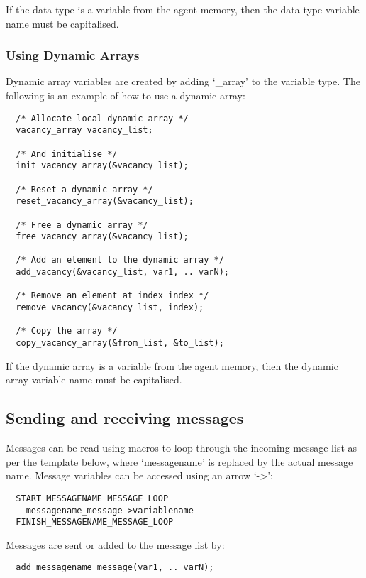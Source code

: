 If the data type is a variable from the agent memory, then the data type
variable name must be capitalised.

\subsubsection{Using Dynamic Arrays}

Dynamic array variables are created by adding `\_array' to the variable type.
The following is an example of how to use a dynamic array:

\begin{verbatim}
  /* Allocate local dynamic array */
  vacancy_array vacancy_list;

  /* And initialise */
  init_vacancy_array(&vacancy_list);
  
  /* Reset a dynamic array */
  reset_vacancy_array(&vacancy_list);
  
  /* Free a dynamic array */
  free_vacancy_array(&vacancy_list);
  
  /* Add an element to the dynamic array */
  add_vacancy(&vacancy_list, var1, .. varN);
  
  /* Remove an element at index index */
  remove_vacancy(&vacancy_list, index);
  
  /* Copy the array */
  copy_vacancy_array(&from_list, &to_list);
\end{verbatim}

If the dynamic array is a variable from the agent memory, then the dynamic
array variable name must be capitalised.

\subsection{Sending and receiving messages}

Messages can be read using macros to loop through the incoming message list as
per the template below, where `messagename' is replaced by the actual message
name. Message variables can be accessed using an arrow `->':

\begin{verbatim}
  START_MESSAGENAME_MESSAGE_LOOP
    messagename_message->variablename
  FINISH_MESSAGENAME_MESSAGE_LOOP
\end{verbatim}

Messages are sent or added to the message list by:

\begin{verbatim}
  add_messagename_message(var1, .. varN);
\end{verbatim}

